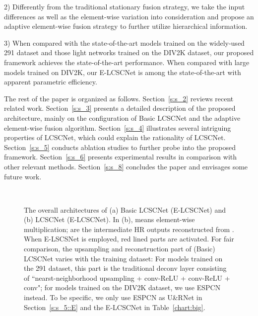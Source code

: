 \documentclass[journal]{IEEEtran}
\begin{document}
2) Differently from the traditional stationary fusion strategy, we take the input differences as well as the element-wise variation into consideration and propose an adaptive element-wise fusion strategy to further utilize hierarchical information.

3) When compared with the state-of-the-art models trained on the widely-used 291 dataset and those light networks trained on the DIV2K dataset, our proposed framework achieves the state-of-the-art performance. When compared with large models trained on DIV2K, our E-LCSCNet is among the state-of-the-art with apparent parametric efficiency.  


The rest of the paper is organized as follows. Section~\ref{s:s_2} reviews recent related work. Section~\ref{s:s_3} presents a detailed description of the proposed architecture, mainly on the configuration of Basic LCSCNet and the adaptive element-wise fusion algorithm. Section~\ref{s:s_4} illustrates several intriguing properties of LCSCNet, which could explain the rationality of LCSCNet. Section~\ref{s:s_5} conducts ablation studies to further probe into the proposed framework. Section~\ref{s:s_6} presents experimental results in comparison with other relevant methods. 
Section~\ref{s:s_8} concludes the paper and envisages some future work. 




\begin{figure*}[htbp]
\centering
{} \\
\caption{\small The overall architectures of (a) Basic LCSCNet (E-LCSCNet) and (b) LCSCNet (E-LCSCNet). In (b),  means element-wise multiplication;  are the intermediate HR outputs reconstructed from . When E-LSCSNet is employed, red lined parts are activated. For fair comparison, the upsampling and reconstruction part of (Basic) LCSCNet varies with the training dataset: For models trained on the 291 dataset, this part is the traditional deconv layer consisting of ``nearst-neighborhood upsampling + conv-ReLU + conv-ReLU + conv"; for models trained on the DIV2K dataset, we use ESPCN~\cite{shi2016real} instead. To be specific, we only use ESPCN as U\&RNet in Section~\ref{s:s_5::E} and the E-LCSCNet in Table~\ref{chart:big}.}
\label{fig:F3}
\end{figure*} 
\end{document}
